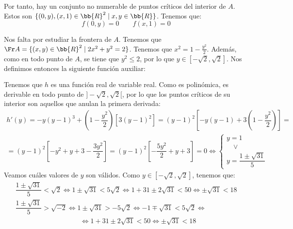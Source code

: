 \begin{ejercicio}
    Por tanto, hay un conjunto no numerable de puntos críticos del interior de $A$. Estos son $\{(0,y), (x,1)\in \bb{R}^2\mid x,y\in \bb{R}\}$. Tenemos que:
    \begin{equation*}
        f(0,y) = 0 \qquad f(x,1) = 0
    \end{equation*}

    Nos falta por estudiar la frontera de $A$. Tenemos que $\Fr A = \{(x,y)\in \bb{R}^2\mid 2x^2+y^2= 2\}$. Tenemos que $x^2 = 1-\frac{y^2}{2}$.
    Además, como en todo punto de $A$, se tiene que $y^2\leq 2$, por lo que $y\in \left[-\sqrt{2},\sqrt{2}\right]$. Nos definimos entonces la siguiente función auxiliar:

    Tenemos que $h$ es una función real de variable real. Como es polinómica, es derivable en todo punto de $]-\sqrt{2},\sqrt{2}[$, por lo que los puntos críticos de su interior son aquellos que anulan la primera derivada:
    \begin{multline*}
        h'(y) = -y(y-1)^3 + \left(1-\dfrac{y^2}{2}\right)[3(y-1)^2]
        = (y-1)^2\left[-y(y-1) + 3\left(1-\dfrac{y^2}{2}\right)\right]
        =\\= (y-1)^2\left[-y^2 + y + 3 - \dfrac{3y^2}{2}\right]
        = (y-1)^2\left[-\dfrac{5y^2}{2} + y + 3\right]
        = 0 \Longleftrightarrow
        \begin{cases}
            y=1 \\
            \quad \lor \\
            y=\dfrac{1\pm \sqrt{31}}{5}
        \end{cases}
    \end{multline*}
    Veamos cuáles valores de $y$ son válidos. Como $y\in \left[-\sqrt{2},\sqrt{2}\right]$, tenemos que:
    \begin{gather*}
        \dfrac{1\pm\sqrt{31}}{5} < \sqrt{2} \Longleftrightarrow 1 \pm \sqrt{31} < 5\sqrt{2} \Longleftrightarrow 1 + 31 \pm 2\sqrt{31} < 50 \Longleftrightarrow \pm \sqrt{31} < 18 \\
        \dfrac{1\pm\sqrt{31}}{5} > \sqrt{-2} \Longleftrightarrow 1 \pm \sqrt{31} >- 5\sqrt{2} \Longleftrightarrow -1 \mp \sqrt{31} < 5\sqrt{2} \Longleftrightarrow \\ \hspace{4cm} \Longleftrightarrow 1 + 31 \pm 2\sqrt{31} < 50 \Longleftrightarrow \pm \sqrt{31} <18
    \end{gather*}


\end{ejercicio}
